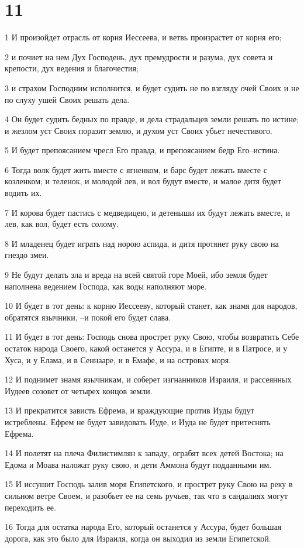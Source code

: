 \chapter{11}

\par 1 И произойдет отрасль от корня Иессеева, и ветвь произрастет от корня его;
\par 2 и почиет на нем Дух Господень, дух премудрости и разума, дух совета и крепости, дух ведения и благочестия;
\par 3 и страхом Господним исполнится, и будет судить не по взгляду очей Своих и не по слуху ушей Своих решать дела.
\par 4 Он будет судить бедных по правде, и дела страдальцев земли решать по истине; и жезлом уст Своих поразит землю, и духом уст Своих убьет нечестивого.
\par 5 И будет препоясанием чресл Его правда, и препоясанием бедр Его--истина.
\par 6 Тогда волк будет жить вместе с ягненком, и барс будет лежать вместе с козленком; и теленок, и молодой лев, и вол будут вместе, и малое дитя будет водить их.
\par 7 И корова будет пастись с медведицею, и детеныши их будут лежать вместе, и лев, как вол, будет есть солому.
\par 8 И младенец будет играть над норою аспида, и дитя протянет руку свою на гнездо змеи.
\par 9 Не будут делать зла и вреда на всей святой горе Моей, ибо земля будет наполнена ведением Господа, как воды наполняют море.
\par 10 И будет в тот день: к корню Иессееву, который станет, как знамя для народов, обратятся язычники, --и покой его будет слава.
\par 11 И будет в тот день: Господь снова прострет руку Свою, чтобы возвратить Себе остаток народа Своего, какой останется у Ассура, и в Египте, и в Патросе, и у Хуса, и у Елама, и в Сеннааре, и в Емафе, и на островах моря.
\par 12 И поднимет знамя язычникам, и соберет изгнанников Израиля, и рассеянных Иудеев созовет от четырех концов земли.
\par 13 И прекратится зависть Ефрема, и враждующие против Иуды будут истреблены. Ефрем не будет завидовать Иуде, и Иуда не будет притеснять Ефрема.
\par 14 И полетят на плеча Филистимлян к западу, ограбят всех детей Востока; на Едома и Моава наложат руку свою, и дети Аммона будут подданными им.
\par 15 И иссушит Господь залив моря Египетского, и прострет руку Свою на реку в сильном ветре Своем, и разобьет ее на семь ручьев, так что в сандалиях могут переходить ее.
\par 16 Тогда для остатка народа Его, который останется у Ассура, будет большая дорога, как это было для Израиля, когда он выходил из земли Египетской.

